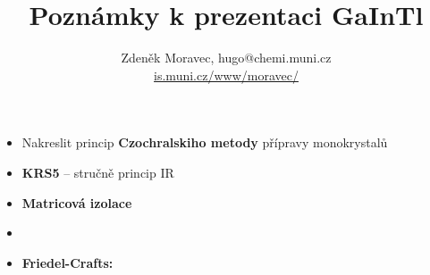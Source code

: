 \documentclass[17pt,a4paper,twoside]{extarticle}
\begin{document}
	
\title{Poznámky k prezentaci GaInTl}
\author{Zdeněk Moravec, hugo@chemi.muni.cz \\
	\href{https://is.muni.cz/www/moravec/c2062_anorganicka_chemie_ii/}{is.muni.cz/www/moravec/}}

\maketitle

\begin{itemize}
	\item Nakreslit princip \textbf{Czochralskiho metody} přípravy monokrystalů
	\item \textbf{KRS5} -- stručně princip IR
	\item \textbf{Matricová izolace}
	\item {}
	\item \textbf{Friedel-Crafts:} 
\end{itemize}

	
\end{document}
